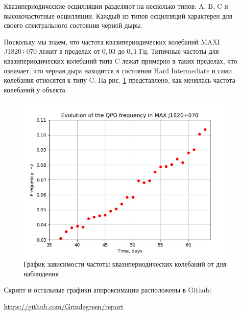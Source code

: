 	\newpage
	
	Квазипериодические осцилляции разделяют на несколько типов: A, B, C и высокочастотные осцилляции. Каждый из типов осцилляций характерен для своего спектрального состояния черной дыры.
	
	Поскольку мы знаем, что частота квазипериодических колебаний MAXI J1820+070 лежит в пределах от $0{,}03$ до $0{,}1$ Гц. Типичные частоты для квазипериодических колебаний типа C лежат примерно в таких пределах, что означает, что черная дыра находится в состоянии Hard Intermediate и сами колебания относятся к типу C. На рис. \ref{img:approx} представлено, как менялась частота колебаний у объекта.
	
	\begin{figure}[h!]
		\centering
		\includegraphics[width = \linewidth]{result}
		\caption{График зависимости частоты квазипериодических колебаний от дня наблюдения}
		\label{img:approx}
	\end{figure}

	Скрипт и остальные графики аппроксимации расположены в Github: 
	
	\url{https://github.com/Grindegreen/report}